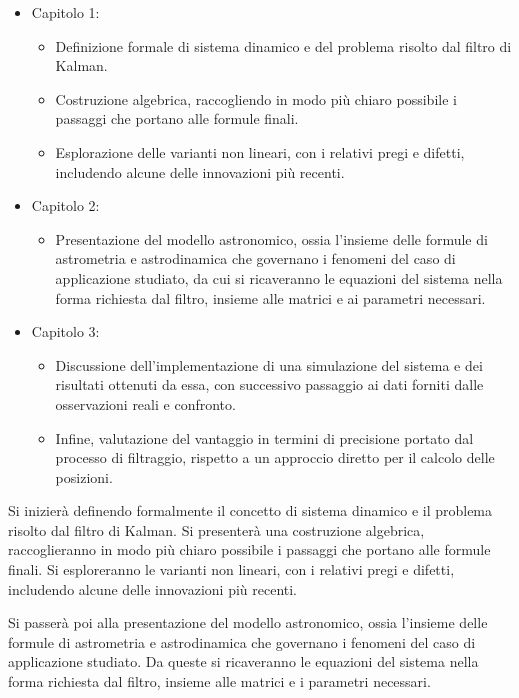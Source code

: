 \documentclass[12pt,a4paper,openright,twoside]{book}
\begin{document}
\begin{itemize}
\item Capitolo 1:
\begin{itemize}
\item Definizione formale di sistema dinamico e del problema risolto dal filtro di Kalman.
\item Costruzione algebrica, raccogliendo in modo più chiaro possibile i passaggi che portano alle formule finali.
\item Esplorazione delle varianti non lineari, con i relativi pregi e difetti, includendo alcune delle innovazioni più recenti.
\end{itemize}
\item Capitolo 2:
\begin{itemize}
\item Presentazione del modello astronomico, ossia l'insieme delle formule di astrometria e astrodinamica che governano i fenomeni del caso di applicazione studiato, da cui si ricaveranno le equazioni del sistema nella forma richiesta dal filtro, insieme alle matrici e ai parametri necessari.
\end{itemize}
\item Capitolo 3:
\begin{itemize}
\item Discussione dell'implementazione di una simulazione del sistema e dei risultati ottenuti da essa, con successivo passaggio ai dati forniti dalle osservazioni reali e confronto.
\item Infine, valutazione del vantaggio in termini di precisione portato dal processo di filtraggio, rispetto a un approccio diretto per il calcolo delle posizioni.
\end{itemize}
\end{itemize}

\iffalse %
Si inizierà definendo formalmente il concetto di sistema dinamico e il problema risolto dal filtro di Kalman. Si presenterà una costruzione algebrica, raccoglieranno in modo più chiaro possibile i passaggi che portano alle formule finali. Si esploreranno le varianti non lineari, con i relativi pregi e difetti, includendo alcune delle innovazioni più recenti.

Si passerà poi alla presentazione del modello astronomico, ossia l'insieme delle formule di astrometria e astrodinamica che governano i fenomeni del caso di applicazione studiato. Da queste si ricaveranno le equazioni del sistema nella forma richiesta dal filtro, insieme alle matrici e i parametri necessari.
\end{document}
